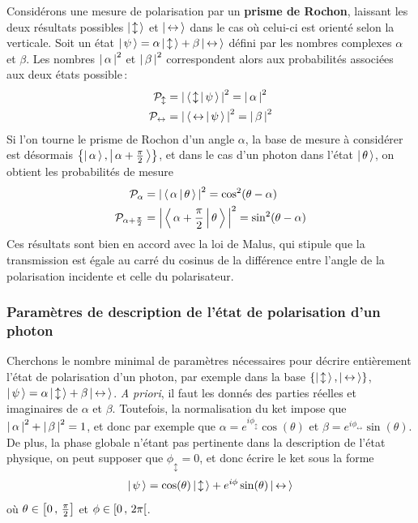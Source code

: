         Considérons une mesure de polarisation par un \textbf{prisme de Rochon}, laissant les deux résultats possibles $\left| \, \updownarrow \, \right>$ et $\left| \, \leftrightarrow \, \right>$ dans le cas où celui-ci est orienté selon la verticale. Soit un état $\left| \, \psi \, \right> = \alpha \left| \, \updownarrow \, \right> + \beta \left| \, \leftrightarrow \, \right>$ défini par les nombres complexes $\alpha$ et $\beta$. Les nombres $\left\lvert \, \alpha \, \right\rvert^2$ et $\left\lvert \, \beta \, \right\rvert^2$ correspondent alors aux probabilités associées aux deux états possible :
        \begin{align*}
            \mathcal{P}_{\updownarrow} &= \left\lvert \, \left< \, \updownarrow \, \middle| \, \psi \, \right> \, \right\rvert^2 = \left\lvert \, \alpha \, \right\rvert^2 \\
            \mathcal{P}_{\leftrightarrow} &= \left\lvert \, \left< \, \leftrightarrow \, \middle| \, \psi \, \right> \, \right\rvert^2 = \left\lvert \, \beta \, \right\rvert^2 \\
        \end{align*}
        Si l’on tourne le prisme de Rochon d’un angle $\alpha$, la base de mesure à considérer est désormais $\left\{\left| \, \alpha \, \right>, \left| \, \alpha + \frac{\pi}{2} \, \right>\right\}$, et dans le cas d’un photon dans l’état $\left| \, \theta \, \right>$, on obtient les probabilités de mesure 
        \begin{align*}
            \mathcal{P}_{\alpha} &= \left\lvert \, \left< \, \alpha \, \middle| \, \theta \, \right> \, \right\rvert^2  = \cos^2(\theta-\alpha) \\
            \mathcal{P}_{\alpha + \frac{\pi}{2}} &= \left\lvert \, \left< \, \alpha + \frac{\pi}{2} \, \middle| \, \theta \, \right> \, \right\rvert^2  = \sin^2(\theta-\alpha) \\
        \end{align*}
        Ces résultats sont bien en accord avec la loi de Malus, qui stipule que la transmission est égale au carré du cosinus de la différence entre l’angle de la polarisation incidente et celle du polarisateur.

        \subsubsection{Paramètres de description de l’état de polarisation d’un photon}

        Cherchons le nombre minimal de paramètres nécessaires pour décrire entièrement l’état de polarisation d’un photon, par exemple dans la base $\left\{\left| \, \updownarrow \, \right>, \left| \, \leftrightarrow \, \right>\right\}$, $\left| \, \psi \, \right> = \alpha \left| \, \updownarrow \, \right> + \beta \left| \, \leftrightarrow \, \right>$. \textit{A priori}, il faut les donnés des parties réelles et imaginaires de $\alpha$ et $\beta$. Toutefois, la normalisation du ket impose que $\left\lvert \, \alpha \, \right\rvert^2 + \left\lvert \, \beta \, \right\rvert^2 = 1$, et donc par exemple que $\alpha = e^{i\phi_{\updownarrow}} \cos(\theta)$ et $\beta = e^{i \phi_{\leftrightarrow}} \sin(\theta)$. De plus, la phase globale n’étant pas pertinente dans la description de l’état physique, on peut supposer que $\phi_{\updownarrow} = 0$, et donc écrire le ket sous la forme 
        \[ \left| \, \psi \, \right> = \cos(\theta)\left| \, \updownarrow \, \right> + e^{i \phi} \sin(\theta)\left| \, \leftrightarrow \, \right> \]   
        où $\theta \in \left[ 0 \, , \, \frac{\pi}{2} \right]$ et $\phi \in \left[ 0 \, , \, 2\pi \right[$.

